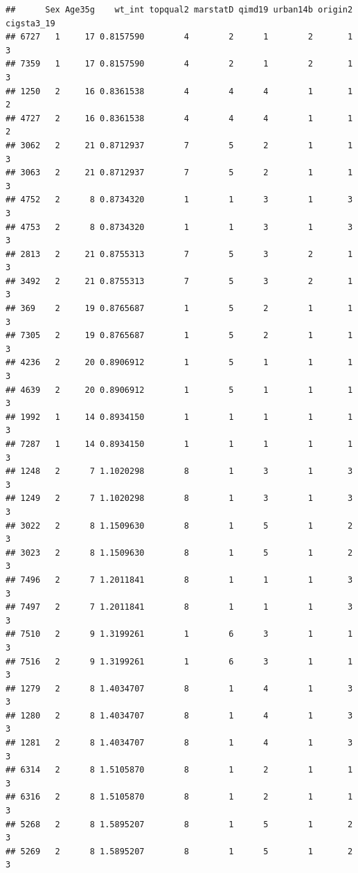 \documentclass[
  11pt,
]{article}
\begin{document}
\begin{verbatim}
##      Sex Age35g    wt_int topqual2 marstatD qimd19 urban14b origin2 cigsta3_19
## 6727   1     17 0.8157590        4        2      1        2       1          3
## 7359   1     17 0.8157590        4        2      1        2       1          3
## 1250   2     16 0.8361538        4        4      4        1       1          2
## 4727   2     16 0.8361538        4        4      4        1       1          2
## 3062   2     21 0.8712937        7        5      2        1       1          3
## 3063   2     21 0.8712937        7        5      2        1       1          3
## 4752   2      8 0.8734320        1        1      3        1       3          3
## 4753   2      8 0.8734320        1        1      3        1       3          3
## 2813   2     21 0.8755313        7        5      3        2       1          3
## 3492   2     21 0.8755313        7        5      3        2       1          3
## 369    2     19 0.8765687        1        5      2        1       1          3
## 7305   2     19 0.8765687        1        5      2        1       1          3
## 4236   2     20 0.8906912        1        5      1        1       1          3
## 4639   2     20 0.8906912        1        5      1        1       1          3
## 1992   1     14 0.8934150        1        1      1        1       1          3
## 7287   1     14 0.8934150        1        1      1        1       1          3
## 1248   2      7 1.1020298        8        1      3        1       3          3
## 1249   2      7 1.1020298        8        1      3        1       3          3
## 3022   2      8 1.1509630        8        1      5        1       2          3
## 3023   2      8 1.1509630        8        1      5        1       2          3
## 7496   2      7 1.2011841        8        1      1        1       3          3
## 7497   2      7 1.2011841        8        1      1        1       3          3
## 7510   2      9 1.3199261        1        6      3        1       1          3
## 7516   2      9 1.3199261        1        6      3        1       1          3
## 1279   2      8 1.4034707        8        1      4        1       3          3
## 1280   2      8 1.4034707        8        1      4        1       3          3
## 1281   2      8 1.4034707        8        1      4        1       3          3
## 6314   2      8 1.5105870        8        1      2        1       1          3
## 6316   2      8 1.5105870        8        1      2        1       1          3
## 5268   2      8 1.5895207        8        1      5        1       2          3
## 5269   2      8 1.5895207        8        1      5        1       2          3

\end{verbatim}
\end{document}
